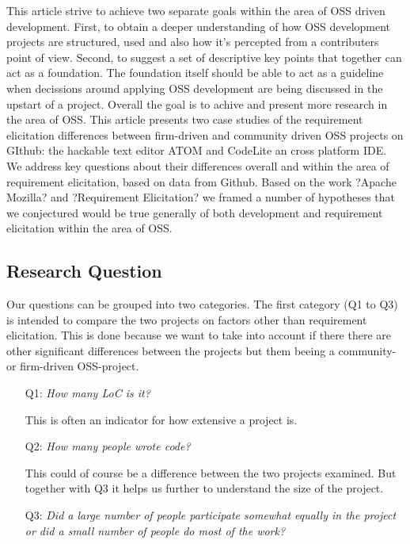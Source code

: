 \documentclass[a4paper,11pt]{article}
\begin{document}
{%

This article strive to achieve two separate goals within the area of OSS driven development. First, to obtain a deeper understanding of how OSS development projects are structured, used and also how it's percepted from a contributers point of view. Second, to suggest a set of descriptive key points that together can act as a foundation. The foundation itself should be able to act as a guideline when decissions around applying OSS development are being discussed in the upstart of a project. Overall the goal is to achive and present more research in the area of OSS.
This article presents two case studies of the requirement elicitation differences between firm-driven and community driven OSS projects on GIthub: the hackable text editor ATOM and CodeLite an cross platform IDE. We address key questions about their differences overall and within the area of requirement elicitation, based on data from Github. Based on the work ?Apache Mozilla? and ?Requirement Elicitation? we framed a number of hypotheses that we conjectured would be true generally of both development and requirement elicitation within the area of OSS. 


\subsection{Research Question}
Our questions can be grouped into two categories. The first category (Q1 to Q3) is intended to compare the two projects on factors other than requirement elicitation. This is done because we want to take into account if there there are other significant differences between the projects but them beeing a community- or firm-driven OSS-project.
\begin{itemize}
	\item[Q1:]\emph{How many LoC is it?}
	
	This is often an indicator for how extensive a project is.
	\item[Q2:]\emph{How many people wrote code?}
	
	This could of course be a difference between the two projects examined. But together with Q3 it helps us further to understand the size of the project.
	\item[Q3:]\emph{Did a large number of people participate somewhat equally in the project or did a small number of people do most of the work?}
	

\end{itemize}}
\end{document}
